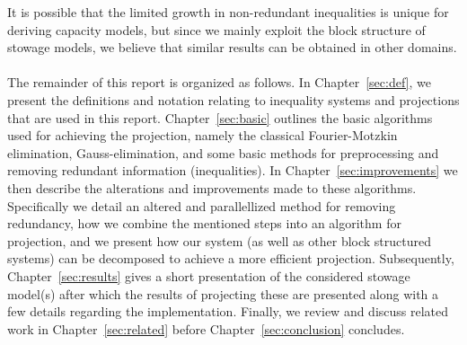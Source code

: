 It is possible that the limited growth in non-redundant inequalities is unique for deriving capacity models, but since we mainly exploit the block structure of stowage models, we believe that similar results can be obtained in other domains.
\\
\\
The remainder of this report is organized as follows.
In Chapter~\ref{sec:def}, we present the definitions and notation relating to inequality systems and projections that are used in this report. 
Chapter~\ref{sec:basic} outlines the basic algorithms used for achieving the projection, namely the classical Fourier-Motzkin elimination, Gauss-elimination, and some basic methods for preprocessing and removing redundant information (inequalities). 
In Chapter~\ref{sec:improvements} we then describe the alterations and improvements made to these algorithms. Specifically we detail an altered and parallellized method for removing redundancy, how we combine the mentioned steps into an algorithm for projection, and we present how our system (as well as other block structured systems) can be decomposed to achieve a more efficient projection.    
Subsequently, Chapter~\ref{sec:results} gives a short presentation of the considered stowage model(s) after which the results of projecting these are presented along with a few details regarding the implementation. 
Finally, we review and discuss related work in Chapter~\ref{sec:related} before Chapter~\ref{sec:conclusion} concludes.
